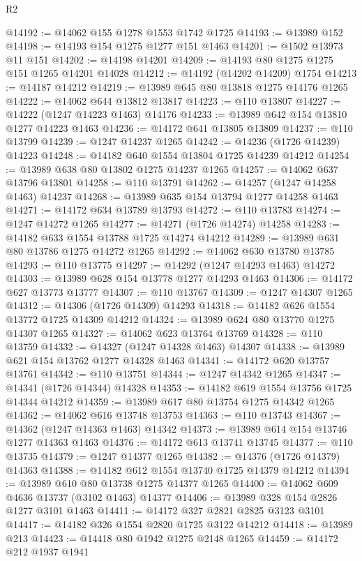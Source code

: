 \begin{lexlean}{R2}
\begin{coremodule}
@14192 := @14062 @155 @1278 @1553 @1742 @1725
@14193 := @13989 @152
@14198 := @14193 @154 @1275 @1277 @151 @1463
@14201 := @1502 @13973 @11 @151
@14202 := @14198 @14201
@14209 := @14193 @80 @1275 @1275 @151 @1265 @14201 @14028
@14212 := @14192 (@14202 @14209) @1754
@14213 := @14187 @14212
@14219 := @13989 @645 @80 @13818 @1275 @14176 @1265
@14222 := @14062 @644 @13812 @13817
@14223 := @110 @13807
@14227 := @14222 (@1247 @14223 @1463) @14176
@14233 := @13989 @642 @154 @13810 @1277 @14223 @1463
@14236 := @14172 @641 @13805 @13809
@14237 := @110 @13799
@14239 := @1247 @14237 @1265
@14242 := @14236 (@1726 @14239) @14223
@14248 := @14182 @640 @1554 @13804 @1725 @14239 @14212
@14254 := @13989 @638 @80 @13802 @1275 @14237 @1265
@14257 := @14062 @637 @13796 @13801
@14258 := @110 @13791
@14262 := @14257 (@1247 @14258 @1463) @14237
@14268 := @13989 @635 @154 @13794 @1277 @14258 @1463
@14271 := @14172 @634 @13789 @13793
@14272 := @110 @13783
@14274 := @1247 @14272 @1265
@14277 := @14271 (@1726 @14274) @14258
@14283 := @14182 @633 @1554 @13788 @1725 @14274 @14212
@14289 := @13989 @631 @80 @13786 @1275 @14272 @1265
@14292 := @14062 @630 @13780 @13785
@14293 := @110 @13775
@14297 := @14292 (@1247 @14293 @1463) @14272
@14303 := @13989 @628 @154 @13778 @1277 @14293 @1463
@14306 := @14172 @627 @13773 @13777
@14307 := @110 @13767
@14309 := @1247 @14307 @1265
@14312 := @14306 (@1726 @14309) @14293
@14318 := @14182 @626 @1554 @13772 @1725 @14309 @14212
@14324 := @13989 @624 @80 @13770 @1275 @14307 @1265
@14327 := @14062 @623 @13764 @13769
@14328 := @110 @13759
@14332 := @14327 (@1247 @14328 @1463) @14307
@14338 := @13989 @621 @154 @13762 @1277 @14328 @1463
@14341 := @14172 @620 @13757 @13761
@14342 := @110 @13751
@14344 := @1247 @14342 @1265
@14347 := @14341 (@1726 @14344) @14328
@14353 := @14182 @619 @1554 @13756 @1725 @14344 @14212
@14359 := @13989 @617 @80 @13754 @1275 @14342 @1265
@14362 := @14062 @616 @13748 @13753
@14363 := @110 @13743
@14367 := @14362 (@1247 @14363 @1463) @14342
@14373 := @13989 @614 @154 @13746 @1277 @14363 @1463
@14376 := @14172 @613 @13741 @13745
@14377 := @110 @13735
@14379 := @1247 @14377 @1265
@14382 := @14376 (@1726 @14379) @14363
@14388 := @14182 @612 @1554 @13740 @1725 @14379 @14212
@14394 := @13989 @610 @80 @13738 @1275 @14377 @1265
@14400 := @14062 @609 @4636 @13737 (@3102 @1463) @14377
@14406 := @13989 @328 @154 @2826 @1277 @3101 @1463
@14411 := @14172 @327 @2821 @2825 @3123 @3101
@14417 := @14182 @326 @1554 @2820 @1725 @3122 @14212
@14418 := @13989 @213
@14423 := @14418 @80 @1942 @1275 @2148 @1265
@14459 := @14172
    @212
    @1937
    @1941

\end{coremodule}
\end{lexlean}
